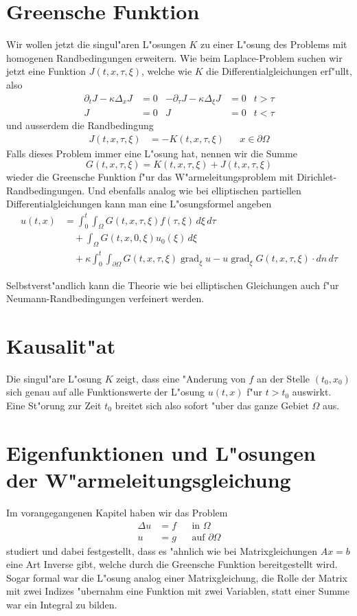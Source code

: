 \section{Greensche Funktion}
Wir wollen jetzt die singul"aren L"osungen $K$ zu einer L"osung des Problems
mit homogenen Randbedingungen erweitern.
Wie beim Laplace-Problem suchen wir jetzt eine Funktion $J(t,x,\tau,\xi)$,
welche wie $K$ die Differentialgleichungen erf"ullt, also
\begin{align*}
\partial_t J-\kappa\Delta_xJ&=0
&
-\partial_\tau J-\kappa\Delta_\xi J&=0
&t>\tau
\\
J&=0&J&=0&t<\tau
\end{align*}
und ausserdem die Randbedingung 
\begin{align*}
J(t,x,\tau,\xi)&=-K(t,x,\tau,\xi)&&x\in\partial\Omega
\end{align*}
Falls dieses Problem immer eine L"osung hat, nennen wir die
Summe
$$G(t,x,\tau,\xi)=K(t,x,\tau,\xi)+J(t,x,\tau,\xi)$$
wieder die Greensche Funktion f"ur das W"armeleitungsproblem
mit Dirichlet-Rand\-bedingungen. Und ebenfalls analog wie bei elliptischen
partiellen Differentialgleichungen kann man eine L"osungsformel
angeben
\begin{align*}
u(t,x)&=
\int_0^t\int_{\Omega}G(t,x,\tau,\xi)f(\tau,\xi)\,d\xi\,d\tau
\\
&\quad+\int_{\Omega}G(t,x,0,\xi)u_0(\xi)\,d\xi
\\
&\quad +\kappa\int_0^t\int_{\partial \Omega}
G(t,x,\tau,\xi)\operatorname{grad}_\xi u
-u\operatorname{grad}_\xi G(t,x,\tau,\xi)\cdot dn\,d\tau
\end{align*}

Selbstverst"andlich kann die Theorie wie bei elliptischen Gleichungen
auch f"ur Neumann-Randbedingungen verfeinert werden.

\section{Kausalit"at}
Die singul"are L"osung $K$ zeigt, dass eine "Anderung von $f$ an der Stelle
$(t_0,x_0)$ sich genau auf alle Funktionswerte der L"osung $u(t,x)$ f"ur
$t>t_0$ auswirkt. Eine St"orung zur Zeit $t_0$ breitet sich also sofort
"uber das ganze Gebiet $\Omega$ aus.

\section{Eigenfunktionen und L"osungen der W"armeleitungsgleichung}
Im vorangegangenen Kapitel haben wir das Problem
\begin{align*}
\Delta u&=f&&\text{in $\Omega$}\\
u&=g&&\text{auf $\partial\Omega$}
\end{align*}
studiert und dabei festgestellt, dass es "ahnlich wie bei Matrixgleichungen
$Ax=b$ eine Art Inverse gibt, welche durch die Greensche Funktion
bereitgestellt wird. Sogar formal war die L"osung analog einer Matrixgleichung,
die Rolle der Matrix mit zwei Indizes "ubernahm eine Funktion mit zwei
Variablen, statt einer Summe war ein Integral zu bilden.

